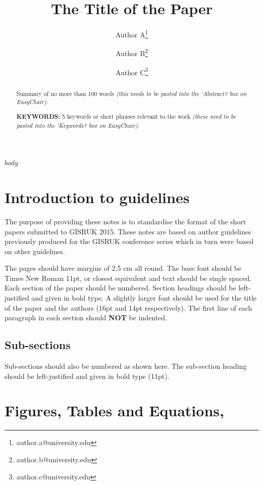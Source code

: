 \documentclass[11pt]{article}
\title{The Title of the Paper}
\author[1]{Author A\thanks{author.a@university.edu}}
\author[1]{Author B\thanks{author.b@university.edu}}
\author[2]{Author C\thanks{author.c@university.edu}}
\affil[1]{Department of Computer Science, \LaTeX\ University}
\affil[2]{Department of Mechanical Engineering, \LaTeX\ University}
\begin{document}
\maketitle


\begin{abstract}
\centering

Summary of no more than 100 words \textit{(this needs to be pasted into the `Abstract? box on EasyChair)}.


{\bf KEYWORDS:} 5 keywords or short phrases relevant to the work \textit{(these need to be pasted into the `Keywords? box on EasyChair)}.

\end{abstract}


$body$

\section{Introduction to guidelines}

The purpose of providing these notes is to standardise the format of the short papers submitted to GISRUK 2015. These notes are based on author guidelines previously produced for the GISRUK conference series which in turn were based on other guidelines.

The pages should have margins of 2.5 cm all round. The base font should be Times New Roman 11pt, or closest equivalent and text should be single spaced. Each section of the paper should be numbered. Section headings should be left-justified and given in bold type.  A slightly larger font should be used for the title of the paper and the authors (16pt and 14pt respectively). The first line of each paragraph in each section should \textbf{NOT} be indented.

\subsection{Sub-sections}

Sub-sections should also be numbered as shown here. The sub-section heading should be left-justified and given in bold type (11pt). 

\section{Figures, Tables and Equations,}
\end{document}
